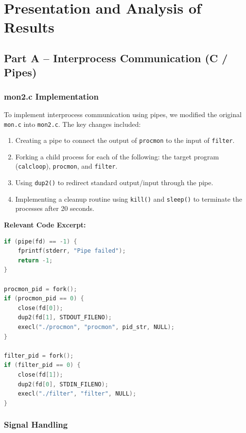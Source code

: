 \documentclass[a4paper,12pt]{article}
\begin{document}
\section{Presentation and Analysis of Results}

\subsection{Part A – Interprocess Communication (C / Pipes)}

\subsubsection*{mon2.c Implementation}

To implement interprocess communication using pipes, we modified the original \texttt{mon.c} into \texttt{mon2.c}. The key changes included:

\begin{enumerate}
    \item Creating a pipe to connect the output of \texttt{procmon} to the input of \texttt{filter}.
    \item Forking a child process for each of the following: the target program (\texttt{calcloop}), \texttt{procmon}, and \texttt{filter}.
    \item Using \texttt{dup2()} to redirect standard output/input through the pipe.
    \item Implementing a cleanup routine using \texttt{kill()} and \texttt{sleep()} to terminate the processes after 20 seconds.
\end{enumerate}

\textbf{Relevant Code Excerpt:}

\begin{lstlisting}[language=C, caption=Excerpt from mon2.c showing pipe and process setup]
if (pipe(fd) == -1) {
    fprintf(stderr, "Pipe failed");
    return -1;
}

procmon_pid = fork();
if (procmon_pid == 0) {
    close(fd[0]);
    dup2(fd[1], STDOUT_FILENO);
    execl("./procmon", "procmon", pid_str, NULL);
}

filter_pid = fork();
if (filter_pid == 0) {
    close(fd[1]);
    dup2(fd[0], STDIN_FILENO);
    execl("./filter", "filter", NULL);
}
\end{lstlisting}

\subsubsection*{Signal Handling}
\end{document}
